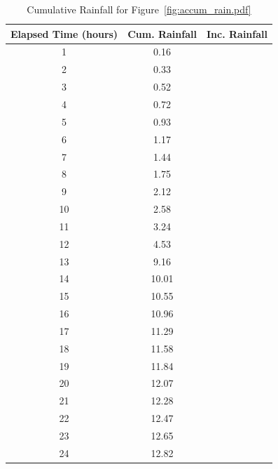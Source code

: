 \documentclass[12pt]{article}
\begin{document}
\begin{enumerate}
\begin{table}[htbp]
   \centering
   \caption{Cumulative Rainfall for Figure~\ref{fig:accum_rain.pdf}}
   \begin{tabular}{ccc} 
    Elapsed Time (hours)&Cum. Rainfall&Inc. Rainfall\\
    \hline
    \hline
      1&  0.16 & ~ \\
      2&  0.33 & ~ \\
      3 & 0.52 & ~ \\
      4&  0.72 & ~ \\
      5 & 0.93 & ~ \\
      6 & 1.17 & ~ \\
      7&  1.44 & ~ \\
      8&  1.75 & ~ \\
      9&  2.12 & ~ \\
    10 & 2.58 & ~ \\
    11&  3.24 & ~ \\
    12&  4.53 & ~ \\
    13 & 9.16 & ~ \\
    14& 10.01 & ~ \\
    15 &10.55 & ~ \\
    16 &10.96 & ~ \\
    17& 11.29 & ~ \\
    18& 11.58 & ~ \\
    19& 11.84 & ~ \\
    20& 12.07 & ~ \\
    21& 12.28 & ~ \\
    22& 12.47 & ~ \\
    23& 12.65 & ~ \\
   24& 12.82 & ~ \\
   \hline
   \end{tabular}

   \label{tab:rainfall}
\end{table}




\end{enumerate}
\end{document}
